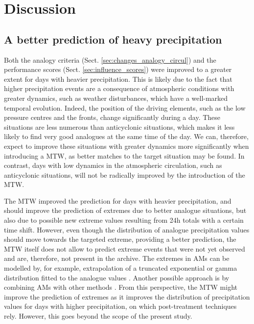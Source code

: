 \documentclass[hess, manuscript]{copernicus}
\begin{document}
	

	\section{Discussion}
	\label{sec:discussion}

	\subsection{A better prediction of heavy precipitation}
	
	Both the analogy criteria (Sect. \ref{sec:changes_analogy_circul}) and the performance scores (Sect. \ref{sec:influence_scores}) were improved to a greater extent for days with heavier precipitation. This is likely due to the fact that higher precipitation events are a consequence of atmospheric conditions with greater dynamics, such as weather disturbances, which have a well-marked temporal evolution. Indeed, the position of the driving elements, such as the low pressure centres and the fronts, change significantly during a day. These situations are less numerous than anticyclonic situations, which makes it less likely to find very good analogues at the same time of the day. We can, therefore, expect to improve these situations with greater dynamics more significantly when introducing a MTW, as better matches to the target situation may be found. In contrast, days with low dynamics in the atmospheric circulation, such as anticyclonic situations, will not be radically improved by the introduction of the MTW.
	
	The MTW improved the prediction for days with heavier precipitation, and should improve the prediction of extremes due to better analogue situations, but also due to possible new extreme values resulting from 24h totals with a certain time shift. However, even though the distribution of analogue precipitation values should move towards the targeted extreme, providing a better prediction, the MTW itself does not allow to predict extreme events that were not yet observed and are, therefore, not present in the archive. The extremes in AMs can be modelled by, for example, extrapolation of a truncated exponential or gamma distribution fitted to the analogue values \citep{Obled2002}. Another possible approach is by combining AMs with other methods \citep[e.g.][]{Chardon2014}. From this perspective, the MTW might improve the prediction of extremes as it improves the distribution of precipitation values for days with higher precipitation, on which post-treatment techniques rely. However, this goes beyond the scope of the present study.
	
\end{document}
